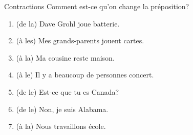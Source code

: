\begin{frame}{Contractions }
  Comment est-ce qu'on change la préposition? \\
  \begin{enumerate}
    \item (de la) Dave Grohl joue \underline{} batterie.
    \item (à les) Mes grands-parents jouent \underline{} cartes.
    \item (à la) Ma cousine reste \underline{} maison.
    \item (à le) Il y a beaucoup de personnes \underline{} concert.
    \item (de le) Est-ce que tu es \underline{} Canada?
    \item (de le) Non, je suis \underline{} Alabama.
    \item (à la) Nous travaillons \underline{} école.
  \end{enumerate}
\end{frame}